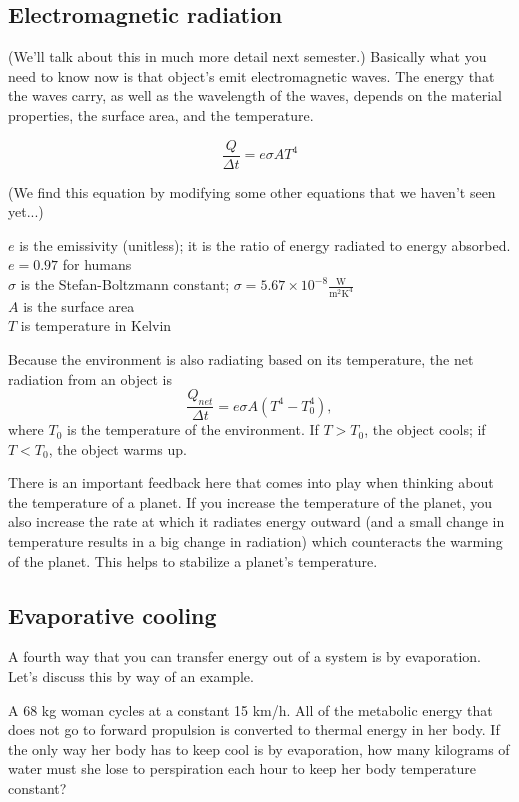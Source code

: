 \subsection{Electromagnetic radiation}
(We'll talk about this in much more detail next semester.) Basically what you need to know now is that object's emit electromagnetic waves. The energy that the waves carry, as well as the wavelength of the waves, depends on the material properties, the surface area, and the temperature.

$$\frac{Q}{\Delta{t}}=e\sigma AT^4$$

(We find this equation by modifying some other equations that we haven't seen yet...)

$e$ is the emissivity (unitless); it is the ratio of energy radiated to energy absorbed. $e=0.97$ for humans\\
$\sigma$ is the Stefan-Boltzmann constant; $\sigma=5.67\times 10^{-8}\frac{\mbox{W}}{\mbox{m}^2\mbox{K}^4}$\\
$A$ is the surface area\\
$T$ is temperature in Kelvin

Because the environment is also radiating based on its temperature, the net radiation from an object is
$$\frac{Q_{net}}{\Delta{t}}=e\sigma A(T^4-T_0^4),$$
where $T_0$ is the temperature of the environment. If $T>T_0$, the object cools; if $T<T_0$, the object warms up.

There is an important feedback here that comes into play when thinking about the temperature of a planet. If you increase the temperature of the planet, you also increase the rate at which it radiates energy outward (and a small change in temperature results in a big change in radiation) which counteracts the warming of the planet. This helps to stabilize a planet's temperature.

\subsection{Evaporative cooling}
A fourth way that you can transfer energy out of a system is by evaporation. Let's discuss this by way of an example.

A 68 kg woman cycles at a constant 15 km/h. All of the metabolic energy that does not go to forward propulsion is converted to thermal energy in her body. If the only way her body has to keep cool is by evaporation, how many kilograms of water must she lose to perspiration each hour to keep her body temperature constant?

